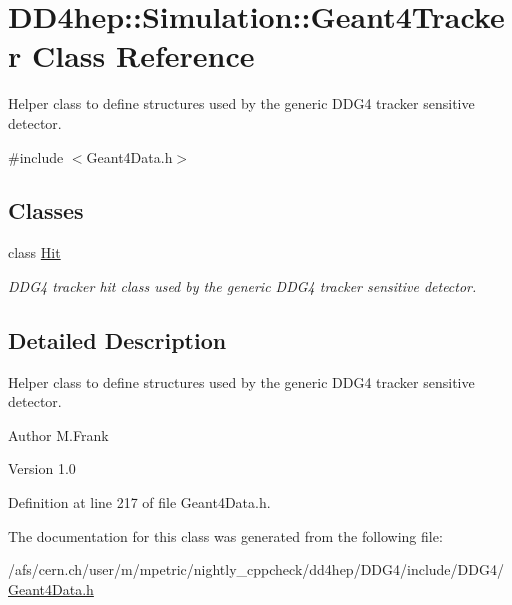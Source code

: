 \hypertarget{class_d_d4hep_1_1_simulation_1_1_geant4_tracker}{
\section{DD4hep::Simulation::Geant4Tracker Class Reference}
\label{class_d_d4hep_1_1_simulation_1_1_geant4_tracker}
}


Helper class to define structures used by the generic DDG4 tracker sensitive detector.  


{\ttfamily \#include $<$Geant4Data.h$>$}\subsection*{Classes}
\begin{DoxyCompactItemize}
\item 
class \hyperlink{class_d_d4hep_1_1_simulation_1_1_geant4_tracker_1_1_hit}{Hit}
\begin{DoxyCompactList}\small\item\em DDG4 tracker hit class used by the generic DDG4 tracker sensitive detector. \item\end{DoxyCompactList}\end{DoxyCompactItemize}


\subsection{Detailed Description}
Helper class to define structures used by the generic DDG4 tracker sensitive detector. \begin{DoxyAuthor}{Author}
M.Frank 
\end{DoxyAuthor}
\begin{DoxyVersion}{Version}
1.0 
\end{DoxyVersion}


Definition at line 217 of file Geant4Data.h.

The documentation for this class was generated from the following file:\begin{DoxyCompactItemize}
\item 
/afs/cern.ch/user/m/mpetric/nightly\_\-cppcheck/dd4hep/DDG4/include/DDG4/\hyperlink{_geant4_data_8h}{Geant4Data.h}\end{DoxyCompactItemize}
